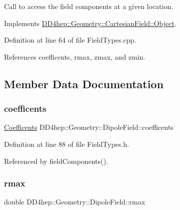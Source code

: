 Call to access the field components at a given location. 



Implements \hyperlink{class_d_d4hep_1_1_geometry_1_1_cartesian_field_1_1_object_ab3fa7f39545c8b0f769ee1ddfd03ed90}{D\+D4hep\+::\+Geometry\+::\+Cartesian\+Field\+::\+Object}.



Definition at line 64 of file Field\+Types.\+cpp.



References coefficents, rmax, zmax, and zmin.



\subsection{Member Data Documentation}
\hypertarget{class_d_d4hep_1_1_geometry_1_1_dipole_field_ae24ace99bfcc72927cd83cf1aede76a9}{}\label{class_d_d4hep_1_1_geometry_1_1_dipole_field_ae24ace99bfcc72927cd83cf1aede76a9} 
\subsubsection{\texorpdfstring{coefficents}{coefficents}}
{\footnotesize\ttfamily \hyperlink{class_d_d4hep_1_1_geometry_1_1_dipole_field_a0e17be76b199f0f144624e6a5eb1f030}{Coefficents} D\+D4hep\+::\+Geometry\+::\+Dipole\+Field\+::coefficents}



Definition at line 88 of file Field\+Types.\+h.



Referenced by field\+Components().

\hypertarget{class_d_d4hep_1_1_geometry_1_1_dipole_field_a554269ad195ae2b4741fb0df32729168}{}\label{class_d_d4hep_1_1_geometry_1_1_dipole_field_a554269ad195ae2b4741fb0df32729168} 
\subsubsection{\texorpdfstring{rmax}{rmax}}
{\footnotesize\ttfamily double D\+D4hep\+::\+Geometry\+::\+Dipole\+Field\+::rmax}



